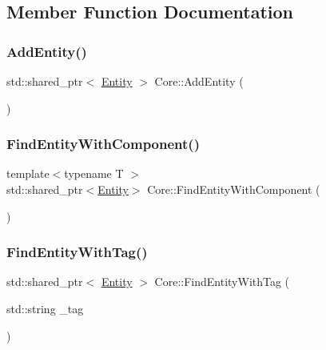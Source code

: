 \subsection{Member Function Documentation}
\mbox{\label{class_core_a6cd7b26cd56b4a42da9ae8826de0df17}} 
\subsubsection{\texorpdfstring{Add\+Entity()}{AddEntity()}}
{\footnotesize\ttfamily std\+::shared\+\_\+ptr$<$ \mbox{\hyperlink{class_entity}{Entity}} $>$ Core\+::\+Add\+Entity (\begin{DoxyParamCaption}{ }\end{DoxyParamCaption})}

\mbox{\label{class_core_a29fd512c6fae721c491de2b1bfcd9ce1}} 
\subsubsection{\texorpdfstring{Find\+Entity\+With\+Component()}{FindEntityWithComponent()}}
{\footnotesize\ttfamily template$<$typename T $>$ \\
std\+::shared\+\_\+ptr$<$\mbox{\hyperlink{class_entity}{Entity}}$>$ Core\+::\+Find\+Entity\+With\+Component (\begin{DoxyParamCaption}{ }\end{DoxyParamCaption})\hspace{0.3cm}{\ttfamily [inline]}}

\mbox{\label{class_core_a57ad2a53d1d291949c31a6c9ba493cdb}} 
\subsubsection{\texorpdfstring{Find\+Entity\+With\+Tag()}{FindEntityWithTag()}}
{\footnotesize\ttfamily std\+::shared\+\_\+ptr$<$ \mbox{\hyperlink{class_entity}{Entity}} $>$ Core\+::\+Find\+Entity\+With\+Tag (\begin{DoxyParamCaption}\item[{std\+::string}]{\+\_\+tag }\end{DoxyParamCaption})}

